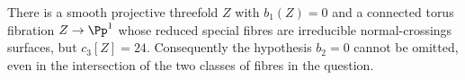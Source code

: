 
\begin{proposition}[P4.10]\hypertarget{tag-02WH}{}\label{night:P4.10}\label{stmt:P4.10}


There is a smooth projective threefold $Z$ with $b_1(Z)=0$ and a
connected torus fibration $Z\to\Pp^1$ whose reduced special fibres
are irreducible normal-crossings surfaces, but $c_3[Z]=24$.
Consequently the hypothesis $b_2=0$ cannot be omitted, even in the
intersection of the two classes of fibres in the question.
\end{proposition}

